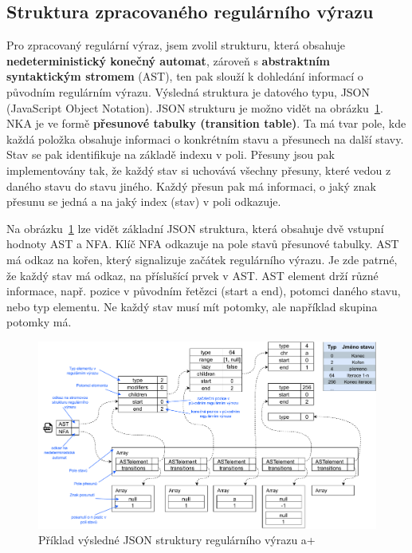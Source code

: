 \subsection*{Struktura zpracovaného regulárního výrazu}

Pro zpracovaný regulární výraz, jsem zvolil strukturu, která obsahuje \textbf{nedeterministický konečný automat}, zároveň s \textbf{abstraktním syntaktickým stromem} (AST), 
ten pak slouží k dohledání informací o původním regulárním výrazu. 
Výsledná struktura je datového typu, JSON (JavaScript Object Notation).
JSON strukturu je možno vidět na obrázku~\ref{fig:JSONex}.
NKA je ve formě \textbf{přesunové tabulky (transition table)}. 
Ta má tvar pole, kde každá položka obsahuje informaci o konkrétním stavu a přesunech na další stavy.
Stav se pak identifikuje na základě indexu v poli. 
Přesuny jsou pak implementovány tak, že každý stav si uchovává všechny přesuny, které vedou z daného stavu do stavu jiného.
Každý přesun pak má informaci, o jaký znak přesunu se jedná a na jaký index (stav) v poli odkazuje. 

Na obrázku~\ref{fig:JSONex} lze vidět základní JSON struktura, která obsahuje dvě vstupní hodnoty AST a NFA.
Klíč NFA odkazuje na pole stavů přesunové tabulky. 
AST má odkaz na kořen, který signalizuje začátek regulárního výrazu.
Je zde patrné, že každý stav má odkaz, na příslušící prvek v AST. 
AST element drží různé informace, např. pozice v původním řetězci (start a end), 
potomci daného stavu, nebo typ elementu. 
Ne každý stav musí mít potomky, ale například skupina potomky má.

\begin{figure}[!h]
	\centering
	\includegraphics[width=1\textwidth]{Figures/BP-JSON.pdf}
	\caption{Příklad výsledné JSON struktury regulárního výrazu a+}
	\label{fig:JSONex}
\end{figure}


